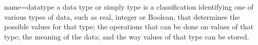 {
   name=datatype
    a data type or simply type is a classification identifying one of various types of data, such as real, integer or Boolean, that determines the possible values for that type; the operations that can be done on values of that type; the meaning of the data; and the way values of that type can be stored.
}   
